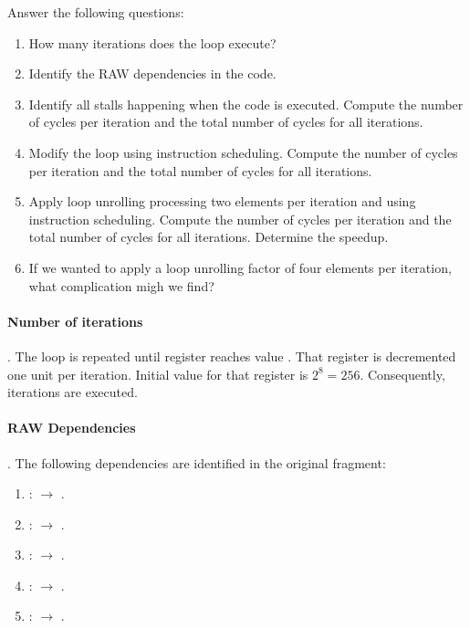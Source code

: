 Answer the following questions:

\begin{enumerate}

\item How many iterations does the loop execute?

\item Identify the RAW dependencies in the code.

\item Identify all stalls happening when the code is executed.
      Compute the number of cycles per iteration and the total number of cycles
      for all iterations.

\item Modify the loop using instruction scheduling.
      Compute the number of cycles per iteration and the total number of cycles
      for all iterations.

\item Apply loop unrolling processing two elements per iteration and using
      instruction scheduling.
      Compute the number of cycles per iteration and the total number of cycles
      for all iterations.
      Determine the speedup.

\item If we wanted to apply a loop unrolling factor of four elements per iteration,
      what complication migh we find?

\end{enumerate}

\begin{acsolution}\end{acsolution}

\paragraph{Number of iterations}.
The loop is repeated until register  reaches value . 
That register is decremented one unit per iteration.
Initial value for that register is $2^8 = 256$. 
Consequently,  iterations are executed.

\paragraph{RAW Dependencies}.
The following dependencies are identified in the original fragment:

\begin{enumerate}

\item {}:  $\rightarrow$ .
\item {}:  $\rightarrow$ .
\item {}:  $\rightarrow$ .
\item {}:  $\rightarrow$ .
\item {}:  $\rightarrow$ .
\end{enumerate}

